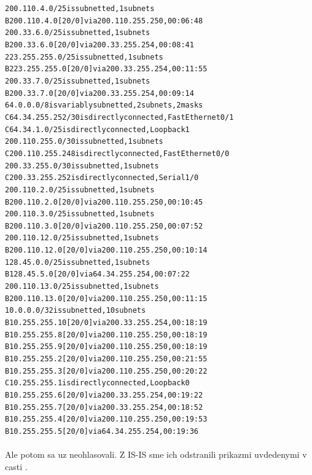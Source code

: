 \documentclass[12pt,twoside,a4paper]{report}
\begin{document}
{\begin{small}
\begin{alltt}
     200.110.4.0/25 is subnetted, 1 subnets
B       200.110.4.0 [20/0] via 200.110.255.250, 00:06:48
     200.33.6.0/25 is subnetted, 1 subnets
B       200.33.6.0 [20/0] via 200.33.255.254, 00:08:41
     223.255.255.0/25 is subnetted, 1 subnets
B       223.255.255.0 [20/0] via 200.33.255.254, 00:11:55
     200.33.7.0/25 is subnetted, 1 subnets
B       200.33.7.0 [20/0] via 200.33.255.254, 00:09:14
     64.0.0.0/8 is variably subnetted, 2 subnets, 2 masks
C       64.34.255.252/30 is directly connected, FastEthernet0/1
C       64.34.1.0/25 is directly connected, Loopback1
     200.110.255.0/30 is subnetted, 1 subnets
C       200.110.255.248 is directly connected, FastEthernet0/0
     200.33.255.0/30 is subnetted, 1 subnets
C       200.33.255.252 is directly connected, Serial1/0
     200.110.2.0/25 is subnetted, 1 subnets
B       200.110.2.0 [20/0] via 200.110.255.250, 00:10:45
     200.110.3.0/25 is subnetted, 1 subnets
B       200.110.3.0 [20/0] via 200.110.255.250, 00:07:52
     200.110.12.0/25 is subnetted, 1 subnets
B       200.110.12.0 [20/0] via 200.110.255.250, 00:10:14
     128.45.0.0/25 is subnetted, 1 subnets
B       128.45.5.0 [20/0] via 64.34.255.254, 00:07:22
     200.110.13.0/25 is subnetted, 1 subnets
B       200.110.13.0 [20/0] via 200.110.255.250, 00:11:15
     10.0.0.0/32 is subnetted, 10 subnets
B       10.255.255.10 [20/0] via 200.33.255.254, 00:18:19
B       10.255.255.8 [20/0] via 200.110.255.250, 00:18:19
B       10.255.255.9 [20/0] via 200.110.255.250, 00:18:19
B       10.255.255.2 [20/0] via 200.110.255.250, 00:21:55
B       10.255.255.3 [20/0] via 200.110.255.250, 00:20:22
C       10.255.255.1 is directly connected, Loopback0
B       10.255.255.6 [20/0] via 200.33.255.254, 00:19:22
B       10.255.255.7 [20/0] via 200.33.255.254, 00:18:52
B       10.255.255.4 [20/0] via 200.110.255.250, 00:19:53
B       10.255.255.5 [20/0] via 64.34.255.254, 00:19:36
\end{alltt}
\end{small}
}

\paragraph{}
Ale potom sa uz neohlasovali. Z IS-IS sme ich odstranili prikazmi uvdedenymi v casti .
\end{document}
